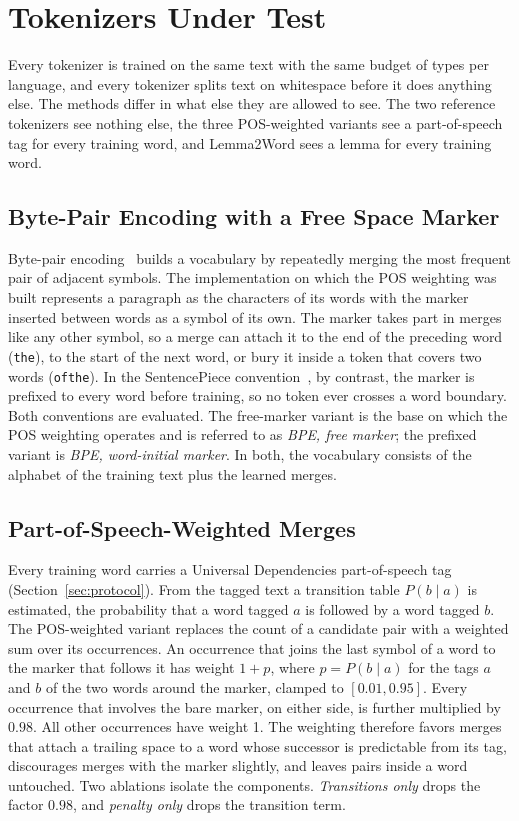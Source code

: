 \section{Tokenizers Under Test}\label{sec:methods}

Every tokenizer is trained on the same text with the same budget of \nVocabBudget{} types per language, and every tokenizer splits text on whitespace before it does anything else.
The methods differ in what else they are allowed to see. The two reference tokenizers see nothing else, the three POS-weighted variants see a part-of-speech tag for every training word, and Lemma2Word sees a lemma for every training word.

\subsection{Byte-Pair Encoding with a Free Space Marker}\label{sec:freebpe}
Byte-pair encoding~\cite{sennrich2016bpe} builds a vocabulary by repeatedly merging the most frequent pair of adjacent symbols.
The implementation on which the POS weighting was built represents a paragraph as the characters of its words with the marker \textvisiblespace{} inserted between words as a symbol of its own.
The marker takes part in merges like any other symbol, so a merge can attach it to the end of the preceding word (\texttt{the\textvisiblespace}), to the start of the next word, or bury it inside a token that covers two words (\texttt{of\textvisiblespace the\textvisiblespace}).
In the SentencePiece convention~\cite{kudo2018sentencepiece}, by contrast, the marker is prefixed to every word before training, so no token ever crosses a word boundary.
Both conventions are evaluated.
The free-marker variant is the base on which the POS weighting operates and is referred to as \emph{BPE, free marker}; the prefixed variant is \emph{BPE, word-initial marker}.
In both, the vocabulary consists of the alphabet of the training text plus the learned merges.

\subsection{Part-of-Speech-Weighted Merges}\label{sec:posbpe}
Every training word carries a Universal Dependencies part-of-speech tag (Section~\ref{sec:protocol}).
From the tagged text a transition table $P(b \mid a)$ is estimated, the probability that a word tagged $a$ is followed by a word tagged $b$.
The POS-weighted variant replaces the count of a candidate pair with a weighted sum over its occurrences.
An occurrence that joins the last symbol of a word to the marker that follows it has weight $1 + p$, where $p = P(b \mid a)$ for the tags $a$ and $b$ of the two words around the marker, clamped to $[0.01, 0.95]$.
Every occurrence that involves the bare marker, on either side, is further multiplied by $0.98$.
All other occurrences have weight 1.
The weighting therefore favors merges that attach a trailing space to a word whose successor is predictable from its tag, discourages merges with the marker slightly, and leaves pairs inside a word untouched.
Two ablations isolate the components. \emph{Transitions only} drops the factor $0.98$, and \emph{penalty only} drops the transition term.

